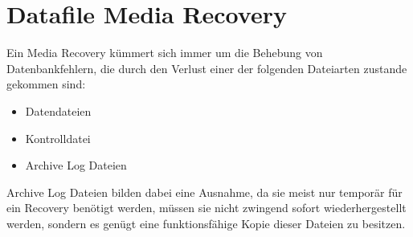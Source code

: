     \section{Datafile Media Recovery}
      Ein Media Recovery kümmert sich immer um die Behebung von Datenbankfehlern, die durch den Verlust einer der folgenden Dateiarten zustande gekommen sind:
      \begin{itemize}
        \item Datendateien
        \item Kontrolldatei
        \item Archive Log Dateien
      \end{itemize}
      Archive Log Dateien bilden dabei eine Ausnahme, da sie meist nur temporär für ein Recovery benötigt werden, müssen sie nicht zwingend sofort wiederhergestellt werden, sondern es genügt eine funktionsfähige Kopie dieser Dateien zu besitzen.
